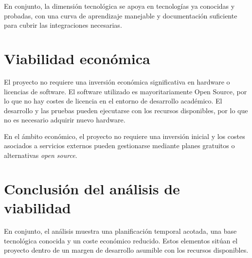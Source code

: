 En conjunto, la dimensión tecnológica se apoya en tecnologías ya conocidas y probadas, con una curva de aprendizaje manejable y documentación suficiente para cubrir las integraciones necesarias.

\section{Viabilidad económica}
El proyecto no requiere una inversión económica significativa en hardware o licencias de software. El software utilizado es mayoritariamente Open Source, por lo que no hay costes de licencia en el entorno de desarrollo académico. El desarrollo y las pruebas pueden ejecutarse con los recursos disponibles, por lo que no es necesario adquirir nuevo hardware.

En el ámbito económico, el proyecto no requiere una inversión inicial y los costes asociados a servicios externos pueden gestionarse mediante planes gratuitos o alternativas \emph{open source}. 

\section{Conclusión del análisis de viabilidad}
En conjunto, el análisis muestra una planificación temporal acotada, una base tecnológica conocida y un coste económico reducido. Estos elementos sitúan el proyecto dentro de un margen de desarrollo asumible con los recursos disponibles.
